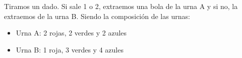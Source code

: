 \documentclass[addpoints,spanish, 12pt,a4paper]{exam}
\begin{document}
\begin{questions}

\question Tiramos un dado. Si sale 1 o 2, extraemos una bola de la urna A y si no, la extraemos de la urna B. Siendo la composición de las urnas:
\begin{itemize}
\item Urna A: 2 rojas, 2 verdes y 2 azules
\item Urna B: 1 roja, 3 verdes y 4 azules
\end{itemize}

\end{questions}
\end{document}
